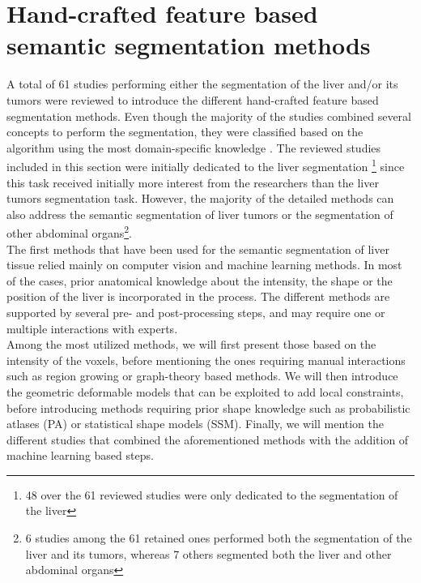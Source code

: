 \section{Hand-crafted feature based semantic segmentation methods}

A total of 61 studies performing either the segmentation of the liver and/or its tumors 
were reviewed to introduce the different hand-crafted feature based segmentation methods. 
Even though the majority of the studies 
 combined several concepts to perform the segmentation, they were classified 
 based on the algorithm using the most domain-specific knowledge \cite{Moghbel2018}.
The reviewed studies included in this section were initially dedicated
 to the liver segmentation \footnote{48 over the 61 reviewed studies were only dedicated to
 the segmentation of the liver} since this task received initially more interest from the researchers than the liver tumors segmentation task. However, 
 the majority of the detailed methods can also address the semantic 
 segmentation of liver tumors or the segmentation of other abdominal 
 organs\footnote{6 studies among the 61 retained ones performed both the 
 segmentation of the liver and its tumors, whereas 7 others segmented both the liver and other abdominal organs}. \\
The first methods that have been used for the semantic segmentation of
liver tissue relied mainly on computer vision and machine
learning methods. In most of the cases, prior anatomical knowledge about
the intensity, the shape or the position of the liver is incorporated in
the process. The different methods are supported by several pre- and
post-processing steps, and may require one or multiple interactions with
experts.\\
Among the most utilized methods, we will first present those based on
the intensity of the voxels, before mentioning the ones requiring manual
interactions such as region growing or graph-theory based methods. We will 
then introduce the geometric deformable models that can be exploited to add 
local constraints, before introducing methods 
requiring prior shape knowledge such as
probabilistic atlases (PA) or statistical shape models (SSM).
Finally, we will mention the different studies that combined the
aforementioned methods with the addition of machine learning based steps.

